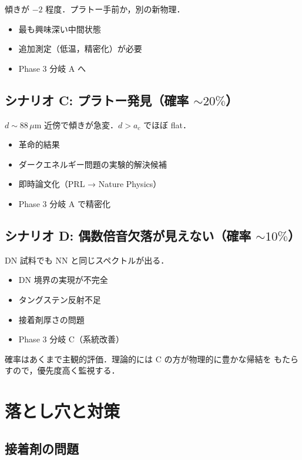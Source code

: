 \documentclass[11pt,a4paper]{article}
\begin{document}
傾きが $-2$ 程度．プラトー手前か，別の新物理．

\begin{itemize}
\item 最も興味深い中間状態
\item 追加測定（低温，精密化）が必要
\item Phase 3 分岐 A へ
\end{itemize}

\subsection{シナリオ C: プラトー発見（確率 $\sim 20\%$）}

$d \sim 88\,\mu$m 近傍で傾きが急変．$d > a_c$ でほぼ flat．

\begin{itemize}
\item 革命的結果
\item ダークエネルギー問題の実験的解決候補
\item 即時論文化（PRL → Nature Physics）
\item Phase 3 分岐 A で精密化
\end{itemize}

\subsection{シナリオ D: 偶数倍音欠落が見えない（確率 $\sim 10\%$）}

DN 試料でも NN と同じスペクトルが出る．

\begin{itemize}
\item DN 境界の実現が不完全
\item タングステン反射不足
\item 接着剤厚さの問題
\item Phase 3 分岐 C（系統改善）
\end{itemize}

確率はあくまで主観的評価．理論的には C の方が物理的に豊かな帰結を
もたらすので，優先度高く監視する．

\section{落とし穴と対策}

\subsection{接着剤の問題}
\end{document}

